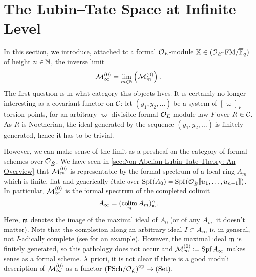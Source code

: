 \documentclass[../main.tex]{subfiles}
\begin{document}
\section{The Lubin--Tate Space at Infinite Level}
In this section, we introduce, attached to a formal $\mathcal{O}_E$-module
$\mathbb{X} \in {({\mathcal{O}_E}\textnormal-\allowbreak\mathrm{FM}/{{\overline{\mathbb{F}}_q}})}$ of height $n \in \mathbb{N}$, the inverse limit
\begin{equation*}
  \mathcal{M}_{\infty}^{(0)} = \lim_{m \in \mathbb{N}} \left(\mathcal{M}_{m}^{(0)}\right).
\end{equation*}
The first question is in what category this objects lives. It is
certainly no longer interesting as a covariant functor on $\mathcal{C}$: let $(y_1,
y_2, \dots)$ be a system of $[\varpi]_F$-torsion points,
for an arbitrary $\varpi$-divisible formal $\mathcal{O}_E$-module law $F$ over
$R \in \mathcal{C}$. As $R$ is Noetherian, the ideal generated by the sequence $(y_1,
y_2, \dots)$ is finitely generated, hence it has to be trivial.

However, we can make sense of the limit as a presheaf on the category of formal
schemes over $\mathcal{O}_{\breve {E}}$. We have seen in \cref{sec:Non-Abelian Lubin-Tate
Theory: An Overview} that $\mathcal{M}_{m}^{(0)}$ is 
representable by the formal spectrum of a local ring $A_m$ which
is finite, flat and generically \'etale
over $\operatorname{Spf}(A_0) = \operatorname{Spf}(\mathcal{O}_{{\breve {E}}}\llbracket u_1, \dots, u_{n-1}\rrbracket)$. In particular,
$\mathcal{M}_{\infty}^{(0)}$ is the formal spectrum of the completed colimit 
\begin{equation*}
  A_\infty = (\operatorname*{colim}_m A_m)^\wedge_{\mathfrak{m}}.
\end{equation*}
Here, $\mathfrak{m}$ denotes the image of the maximal ideal of $A_0$ (or of any $A_m$, it doesn't
matter). 
Note that the completion along an arbitrary ideal $I \subset A_\infty$ is, in
general, not $I$-adically complete (see
\cite[\href{https://stacks.math.columbia.edu/tag/05JA}{Tag
05JA}]{stacks-project} for an example). However, the maximal ideal $\mathfrak{m}$ is
finitely generated, so this pathology does not occur and $\mathcal{M}_\infty^{(0)}
\coloneqq \operatorname{Spf} A_\infty$ makes senes as a formal scheme. A priori, it is not
clear if there is a good moduli description of $\mathcal{M}_\infty^{(0)}$ as a functor
${(\mathrm{FSch}/{\mathcal{O}_{\breve {E}}})}^{{\mathrm{op}}} \to {(\mathrm{Set})}$.
\end{document}
